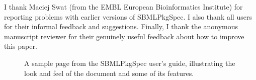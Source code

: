 \documentclass{bmcart}
\newcommand{\sbmlpkg}{SBMLPkgSpec}
\begin{document}
I thank Maciej Swat (from the EMBL European Bioinformatics Institute) for reporting problems with earlier versions of \sbmlpkg.  I also thank all users for their informal feedback and suggestions.  Finally, I thank the anonymous manuscript reviewer for their genuinely useful feedback about how to improve this paper. 









\begin{figure}[h!]
\caption{A sample page from the \sbmlpkg{} user's guide, illustrating the look and feel of the document and some of its features.}
\end{figure}
\end{document}
